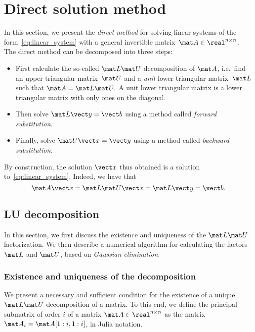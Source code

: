 \section{Direct solution method}%
\label{sec:direct_solution_method}
In this section,
we present the \emph{direct method} for solving linear systems of the form~\eqref{eq:linear_system}
with a general invertible matrix~$\mat A \in \real^{n \times n}$.
The direct method can be decomposed into three steps:
\begin{itemize}
    \item
        First calculate the so-called $\mat L \mat U$ decomposition of $\mat A$,
        i.e.\ find an upper triangular matrix~$\mat U$ and a \emph{unit} lower triangular matrix~$\mat L$ such that
        \(
            \mat A = \mat L \mat U.
        \)
        A unit lower triangular matrix is a lower triangular matrix with only ones on the diagonal.

    \item
        Then solve
        \(
            \mat L \vect y = \vect b
        \)
         using a method called \emph{forward substitution}.

    \item
        Finally, solve
        \(
            \mat U \vect x = \vect y
        \)
         using a method called \emph{backward substitution}.
\end{itemize}
By construction, the solution $\vect x$ thus obtained is a solution to~\eqref{eq:linear_system}.
Indeed, we have that
\[
    \mat A \vect x = \mat L \mat U \vect x = \mat L \vect y = \vect b.
\]

\subsection{LU decomposition}%
\label{sub:lu_decomposition}

In this section,
we first discuss the existence and uniqueness of the $\mat L \mat U$ factorization.
We then describe a numerical algorithm for calculating the factors $\mat L$ and $\mat U$,
based on \emph{Gaussian elimination}.

\subsubsection*{Existence and uniqueness of the decomposition}%
We present a necessary and sufficient condition for the existence of a unique $\mat L \mat U$ decomposition of a matrix.
To this end, we define the principal submatrix of order $i$ of a matrix $\mat A \in \real^{n \times n}$
as the matrix $\mat A_i = \mat A[1:i, 1:i]$, in Julia notation.

